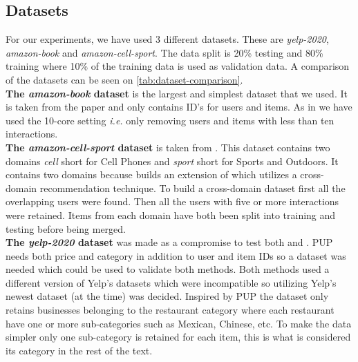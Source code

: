 \subsection{Datasets}
For our experiments, we have used 3 different datasets.
These are \textit{yelp-2020}, \textit{amazon-book} and \textit{amazon-cell-sport}.
The data split is 20\% testing and 80\% training where 10\% of the training data is used as validation data.
A comparison of the datasets can be seen on \autoref{tab:dataset-comparison}.
\\
\textbf{The \textit{amazon-book} dataset} is the largest and simplest dataset that we used.
It is taken from the \cite{lightgcn} paper and only contains ID's for users and items.
As in \cite{lightgcn} we have used the 10-core setting \textit{i.e.} only removing users and items with less than ten interactions.
\\
\textbf{The \textit{amazon-cell-sport} dataset} is taken from \cite{BiTGCF}.
This dataset contains two domains \textit{cell} short for Cell Phones and \textit{sport} short for Sports and Outdoors.
It contains two domains because \cite{BiTGCF} builds an extension of \cite{lightgcn} which utilizes a cross-domain recommendation technique.
To build a cross-domain dataset first all the overlapping users were found.
Then all the users with five or more interactions were retained.
Items from each domain have both been split into training and testing before being merged.
\\
\textbf{The \textit{yelp-2020} dataset} was made as a compromise to test both \cite{lightgcn} and \cite{PUP}.
PUP needs both price and category in addition to user and item IDs so a dataset was needed which could be used to validate both methods.
Both methods used a different version of Yelp's datasets which were incompatible so utilizing Yelp's newest dataset (at the time) was decided.
Inspired by PUP the dataset only retains businesses belonging to the restaurant category where each restaurant have one or more sub-categories such as Mexican, Chinese, etc.
To make the data simpler only one sub-category is retained for each item, this is what is considered its category in the rest of the text.


